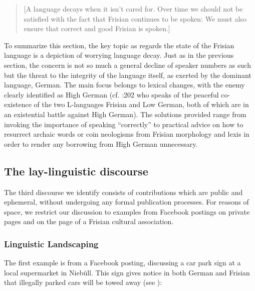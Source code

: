 \documentclass[output=paper]{langsci/langscibook}
\begin{document}
\begin{quote}
[A language decays when it isn’t cared for. Over time we should not be satisfied with the fact that Frisian continues to be spoken: We must also ensure that correct and good Frisian is spoken.]
\end{quote}

To summarize this section, the key topic as regards the state of the Frisian language is a depiction of worrying language decay. Just as in the previous section, the concern is not so much a general decline of speaker numbers as such but the threat to the integrity of the language itself, as exerted by the dominant language, German. The main focus belongs to lexical changes, with the enemy clearly identified as High German (cf. \citealt{Arhammar1973}:202 who speaks of the peaceful co-existence of the two L-languages Frisian and Low German, both of which are in an existential battle against High German). The solutions provided range from invoking the importance of speaking “correctly” to practical advice on how to resurrect archaic words or coin neologisms from Frisian morphology and lexis in order to render any borrowing from High German unnecessary.

\subsection{The lay-linguistic discourse}
\label{sec:gregersen:5.3}

The third discourse we identify consists of contributions which are public and ephemeral, without undergoing any formal publication processes. For reasons of space, we restrict our discussion to examples from Facebook postings on private pages and on the page of a Frisian cultural association. 

\subsubsection{Linguistic Landscaping}
\label{sec:gregersen:5.3.1}

The first example is from a Facebook posting, discussing a car park sign at a local supermarket in Niebüll. This sign gives notice in both German and Frisian that illegally parked cars will be towed away (see ):

 
 
\end{document}
